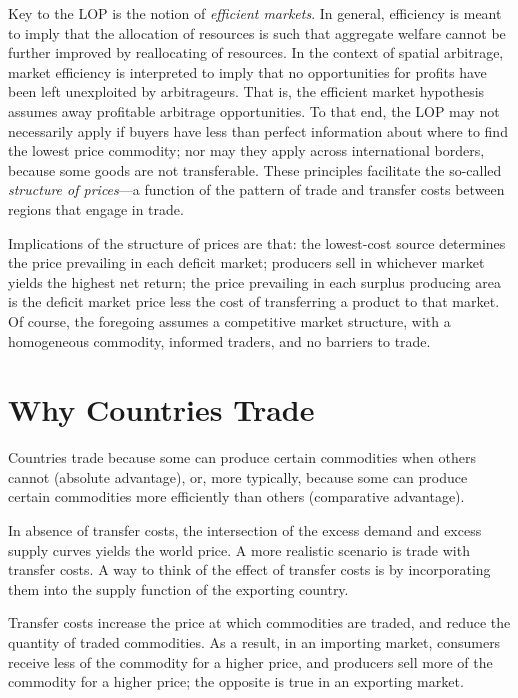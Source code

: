 \documentclass[
  oneside]{book}
\begin{document}
Key to the LOP is the notion of \emph{efficient markets}. In general, efficiency is meant to imply that the allocation of resources is such that aggregate welfare cannot be further improved by reallocating of resources. In the context of spatial arbitrage, market efficiency is interpreted to imply that no opportunities for profits have been left unexploited by arbitrageurs. That is, the efficient market hypothesis assumes away profitable arbitrage opportunities. To that end, the LOP may not necessarily apply if buyers have less than perfect information about where to find the lowest price commodity; nor may they apply across international borders, because some goods are not transferable. These principles facilitate the so-called \emph{structure of prices}---a function of the pattern of trade and transfer costs between regions that engage in trade.

Implications of the structure of prices are that: the lowest-cost source determines the price prevailing in each deficit market; producers sell in whichever market yields the highest net return; the price prevailing in each surplus producing area is the deficit market price less the cost of transferring a product to that market. Of course, the foregoing assumes a competitive market structure, with a homogeneous commodity, informed traders, and no barriers to trade.

\hypertarget{why-countries-trade}{%
\section{Why Countries Trade}\label{why-countries-trade}}

Countries trade because some can produce certain commodities when others cannot (absolute advantage), or, more typically, because some can produce certain commodities more efficiently than others (comparative advantage).

In absence of transfer costs, the intersection of the excess demand and excess supply curves yields the world price. A more realistic scenario is trade with transfer costs. A way to think of the effect of transfer costs is by incorporating them into the supply function of the exporting country.

Transfer costs increase the price at which commodities are traded, and reduce the quantity of traded commodities. As a result, in an importing market, consumers receive less of the commodity for a higher price, and producers sell more of the commodity for a higher price; the opposite is true in an exporting market.
\end{document}
